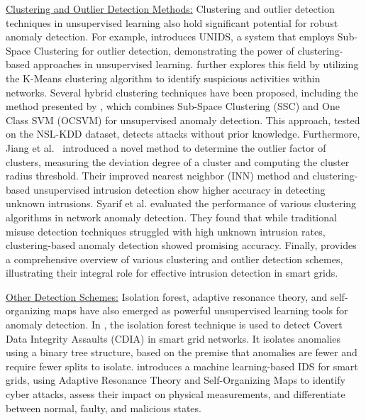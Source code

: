 \documentclass[10pt, journal]{IEEEtran}
\begin{document}
\underline{Clustering and Outlier Detection Methods:}
Clustering and outlier detection techniques in unsupervised learning also hold significant potential for robust anomaly detection. For example, \cite{casas2012unsupervised} introduces UNIDS, a system that employs Sub-Space Clustering for outlier detection, demonstrating the power of clustering-based approaches in unsupervised learning. \cite{bhaumik2011clustering} further explores this field by utilizing the K-Means clustering algorithm to identify suspicious activities within networks.
Several hybrid clustering techniques have been proposed, including the method presented by \cite{pu2020hybrid}, which combines Sub-Space Clustering (SSC) and One Class SVM (OCSVM) for unsupervised anomaly detection. This approach, tested on the NSL-KDD dataset, detects attacks without prior knowledge. Furthermore, Jiang et al. \cite{jiang2006clustering} introduced a novel method to determine the outlier factor of clusters, measuring the deviation degree of a cluster and computing the cluster radius threshold. Their improved nearest neighbor (INN) method and clustering-based unsupervised intrusion detection show higher accuracy in detecting unknown intrusions. Syarif et al. \cite{syarif2012unsupervised} evaluated the performance of various clustering algorithms in network anomaly detection. They found that while traditional misuse detection techniques struggled with high unknown intrusion rates, clustering-based anomaly detection showed promising accuracy. Finally, \cite{patcha2007overview} provides a comprehensive overview of various clustering and outlier detection schemes, illustrating their integral role for effective intrusion detection in smart grids.


				
\underline{Other Detection Schemes:} Isolation forest, adaptive resonance theory, and self-organizing maps have also emerged as powerful unsupervised learning tools for anomaly detection. In \cite{ahmed2019unsupervised}, the isolation forest technique is used to detect Covert Data Integrity Assaults (CDIA) in smart grid networks. It isolates anomalies using a binary tree structure, based on the premise that anomalies are fewer and require fewer splits to isolate. \cite{valdes2016anomaly} introduces a machine learning-based IDS for smart grids, using Adaptive Resonance Theory and Self-Organizing Maps to identify cyber attacks, assess their impact on physical measurements, and differentiate between normal, faulty, and malicious states.
\end{document}
